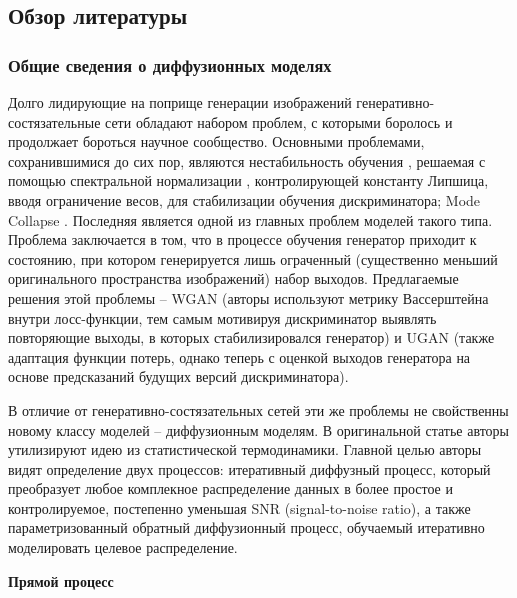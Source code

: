 \subsection{Обзор литературы}

\subsubsection{Общие сведения о диффузионных моделях}
\par
Долго лидирующие на поприще генерации изображений генеративно-состязательные сети обладают набором проблем, с которыми боролось и продолжает бороться научное сообщество. Основными проблемами, сохранившимися до сих пор, являются нестабильность обучения \cite{kodali2017convergence}, решаемая с помощью спектральной нормализации \cite{miyato2018spectral}, контролирующей константу Липшица, вводя ограничение весов, для стабилизации обучения дискриминатора; Mode Collapse \cite{thanhtung2020catastrophic}. Последняя является одной из главных проблем моделей такого типа. Проблема заключается в том, что в процессе обучения генератор приходит к состоянию, при котором генерируется лишь ограченный (существенно меньший оригинального пространства изображений) набор выходов. Предлагаемые решения этой проблемы -- WGAN \cite{arjovsky2017wasserstein} (авторы используют метрику Вассерштейна внутри лосс-функции, тем самым мотивируя дискриминатор выявлять повторяющие выходы, в которых стабилизировался генератор) и UGAN \cite{metz2017unrolled} (также адаптация функции потерь, однако теперь с оценкой выходов генератора на основе предсказаний будущих версий дискриминатора).

\par
В отличие от генеративно-состязательных сетей эти же проблемы не свойственны новому классу моделей -- диффузионным моделям. В оригинальной статье \cite{sohldickstein2015deep} авторы утилизируют идею из статистической термодинамики. Главной целью авторы видят определение двух процессов: итеративный диффузный процесс, который преобразует любое комплекное распределение данных в более простое и контролируемое, постепенно уменьшая SNR (signal-to-noise ratio), а также параметризованный обратный диффузионный процесс, обучаемый итеративно моделировать целевое распределение.


\textbf{Прямой процесс}


